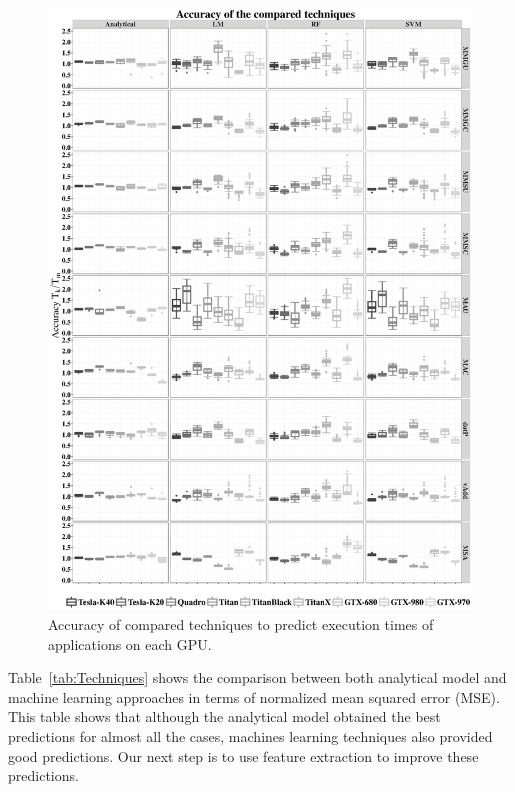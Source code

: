 \begin{figure}[htpb]
 \centering
 \includegraphics[scale=.3]{./images/ResultTechniques.eps}
 \caption{Accuracy of compared techniques to predict execution times of applications on each GPU.}
 \label{fig:AccuracyAM}
\end{figure}

Table~\ref{tab:Techniques} shows the comparison between both analytical model and machine learning approaches in terms of normalized mean squared error (MSE). This table shows that although the analytical model obtained the best predictions for almost all the cases, machines  learning  techniques  also provided good predictions. Our next step is to use feature extraction to improve these predictions.

